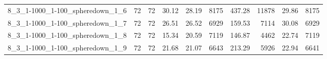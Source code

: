 \begin{center}
\begin{scriptsize}
\begin{longtable}{lrrrrrrrrr}
8\_3\_1-1000\_1-100\_spheredown\_1\_6 & 72 & 72 & 30.12 & 28.19 & 8175 & 437.28 & 11878 & 29.86 & 8175\\
8\_3\_1-1000\_1-100\_spheredown\_1\_7 & 72 & 72 & 26.51 & 26.52 & 6929 & 159.53 & 7114 & 30.08 & 6929\\
8\_3\_1-1000\_1-100\_spheredown\_1\_8 & 72 & 72 & 15.34 & 20.59 & 7119 & 146.87 & 4462 & 22.74 & 7119\\
8\_3\_1-1000\_1-100\_spheredown\_1\_9 & 72 & 72 & 21.68 & 21.07 & 6643 & 213.29 & 5926 & 22.94 & 6641\\
\bottomrule
\end{longtable}
\end{scriptsize}
\end{center}

